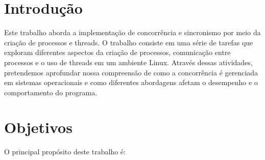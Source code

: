 \documentclass[
	12pt,				%
	openright,			%
	oneside,			%
	a4paper,			%
	chapter=TITLE,		%
	english,			%
	french,				%
	spanish,			%
	brazil				%
	]{abntex2}
\theoremstyle{definition}
\begin{document}
\frenchspacing 

\imprimircapa


\imprimirfolhaderosto

\newpage

\setlength{\absparsep}{18pt} %

\tableofcontents*
\cleardoublepage
\textual


\chapter{Introdução}

Este trabalho aborda a implementação de concorrência e 
sincronismo por meio da criação de processos e threads. O 
trabalho consiste em uma série de tarefas que exploram diferentes 
aspectos da criação de processos, comunicação entre processos e o 
uso de threads em um ambiente Linux. Através dessas atividades, 
pretendemos aprofundar nossa compreensão de como a concorrência é 
gerenciada em sistemas operacionais e como diferentes abordagens afetam 
o desempenho e o comportamento do programa.


\chapter{Objetivos}

O principal propósito deste trabalho é:
\end{document}
